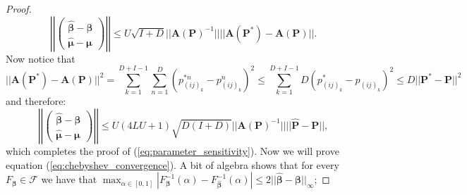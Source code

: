 \documentclass[twoside,11pt]{article}
\begin{document}
\begin{proof}
$$\left|\left|\left(\begin{array}{c}
     \boldsymbol{\hat{\beta}} -\boldsymbol{\beta}\\
     \boldsymbol{\hat{\mu}} -\boldsymbol{\mu} 
\end{array}\right) \right|\right| \leq  U\sqrt{I+D} || \boldsymbol{A}(\boldsymbol{P})^{-1}|| ||\boldsymbol{A}(\boldsymbol{P^*}) - \boldsymbol{A}(\boldsymbol{P})||. $$
Now notice that
$$||\boldsymbol{A}(\boldsymbol{P^*}) - \boldsymbol{A}(\boldsymbol{P}) ||^2 = \sum_{k = 1}^{D+I-1}\sum_{n = 1}^{D}(p^{*n}_{(ij)_k}-p^{n}_{(ij)_k})^2 \leq \sum_{k = 1}^{D+I-1}D (p^{*}_{(ij)_k}-p_{(ij)_k})^2 \leq D ||\boldsymbol{P^*} - \boldsymbol{P} ||^2$$
and therefore:
$$\left|\left|\left(\begin{array}{c}
     \boldsymbol{\hat{\beta}} -\boldsymbol{\beta}\\
     \boldsymbol{\hat{\mu}} -\boldsymbol{\mu} 
\end{array}\right) \right|\right| \leq  U(4LU+1)\sqrt{D(I+D)} || \boldsymbol{A}(\boldsymbol{P})^{-1}|| ||\boldsymbol{\hat P} - \boldsymbol{P}||, $$
 which completes the proof of (\ref{eq:parameter_sensitivity}). Now we will prove equation (\ref{eq:chebyshev_convergence}). A bit of algebra shows that for every $F_{\boldsymbol{\beta}} \in \mathcal{F}$ we have that $\max_{\alpha \in [0,1] }|F^{-1}_{\boldsymbol{\beta}}(\alpha) - F^{-1}_{\boldsymbol{\hat \beta}}(\alpha)| \leq 2||\boldsymbol{\hat{\beta}}-\boldsymbol{\beta}||_{\infty}$; 

\end{proof}
\end{document}
